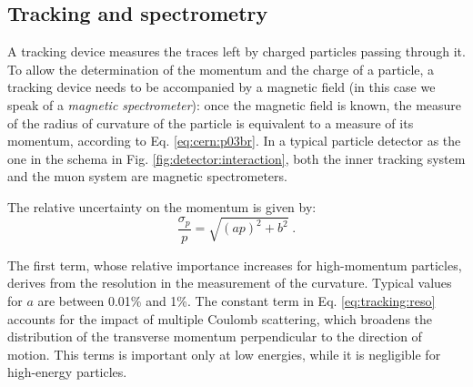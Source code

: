 \subsection{Tracking and spectrometry}
\label{sec:dec:tracking}
A tracking device measures the traces left by charged particles passing through it. To allow the determination of the momentum and the charge of a particle, a tracking device needs to be accompanied by a magnetic field (in this case we speak of a \textit{magnetic spectrometer}): once the magnetic field is known, the measure of the radius of curvature of the particle is equivalent to a measure of its momentum, according to Eq. \ref{eq:cern:p03br}. In a typical particle detector as the one in the schema in Fig. \ref{fig:detector:interaction}, both the inner tracking system and the muon system are magnetic spectrometers.

The relative uncertainty on the momentum is given by:
\begin{equation}
\frac{\sigma_p}{p} = \sqrt{ \left(a p \right)^2 + b^2} \; .
\label{eq:tracking:reso}
\end{equation}

The first term, whose relative importance increases for high-momentum particles, derives from the resolution in the measurement of the curvature. Typical values for $a$ are between 0.01\% and 1\%. The constant term in Eq. \ref{eq:tracking:reso} accounts for the impact of multiple Coulomb scattering, which broadens the distribution of the transverse momentum perpendicular to the direction of motion. This terms is important only at low energies, while it is negligible for high-energy particles.

